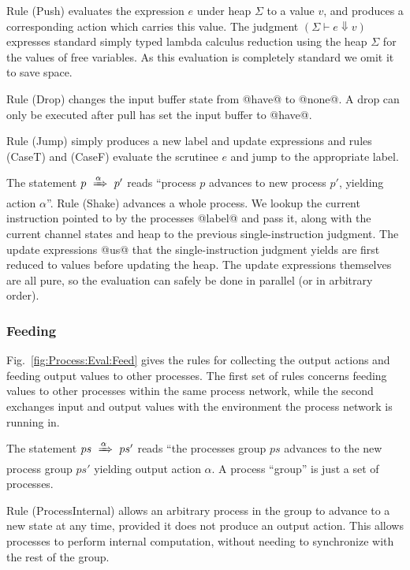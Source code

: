 Rule (Push) evaluates the expression $e$ under heap $\Sigma$ to a value $v$, and produces a corresponding action which carries this value. The judgment $(\Sigma \vdash e \Downarrow v)$ expresses standard simply typed lambda calculus reduction using the heap $\Sigma$ for the values of free variables. As this evaluation is completely standard we omit it to save space.

Rule (Drop) changes the input buffer state from @have@ to @none@. A drop can only be executed after pull has set the input buffer to @have@. 

Rule (Jump) simply produces a new label and update expressions and rules (CaseT) and (CaseF) evaluate the scrutinee $e$ and jump to the appropriate label.

The statement $p~\xRightarrow{\alpha}~p'$ reads ``process $p$ advances to new process $p'$, yielding action $\alpha$''. Rule (Shake) advances a whole process. We lookup the current instruction pointed to by the processes @label@ and pass it, along with the current channel states and heap to the previous single-instruction judgment. The update expressions @us@ that the single-instruction judgment yields are first reduced to values before updating the heap. The update expressions themselves are all pure, so the evaluation can safely be done in parallel (or in arbitrary order).


\subsubsection{Feeding}
Fig.~\ref{fig:Process:Eval:Feed} gives the rules for collecting the output actions and feeding output values to other processes. The first set of rules concerns feeding values to other processes within the same process network, while the second exchanges input and output values with the environment the process network is running in.

\eject{}
The statement $ps~\xRightarrow{\alpha}~ps'$ reads ``the processes group $ps$ advances to the new process group $ps'$ yielding output action $\alpha$. A process ``group'' is just a set of processes. 

Rule (ProcessInternal) allows an arbitrary process in the group to advance to a new state at any time, provided it does not produce an output action. This allows processes to perform internal computation, without needing to synchronize with the rest of the group.

